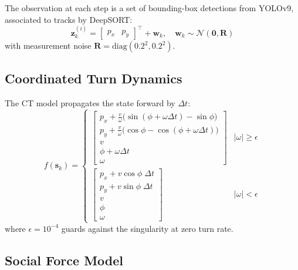 \documentclass[conference]{IEEEtran}
\begin{document}
The observation at each step is a set of bounding-box detections from YOLOv9, associated to tracks by DeepSORT:
\begin{equation}
    \mathbf{z}_k^{(i)} = \begin{bmatrix} p_x & p_y \end{bmatrix}^\top + \mathbf{w}_k, \quad \mathbf{w}_k \sim \mathcal{N}(\mathbf{0}, \mathbf{R})
\end{equation}
with measurement noise $\mathbf{R} = \mathrm{diag}(0.2^2, 0.2^2)$.

\subsection{Coordinated Turn Dynamics}

The CT model propagates the state forward by $\Delta t$:
\begin{equation}
    f(\mathbf{s}_k) = \begin{cases}
    \begin{bmatrix}
        p_x + \frac{v}{\omega}\bigl(\sin(\phi + \omega\Delta t) - \sin\phi\bigr) \\
        p_y + \frac{v}{\omega}\bigl(\cos\phi - \cos(\phi + \omega\Delta t)\bigr) \\
        v \\
        \phi + \omega\Delta t \\
        \omega
    \end{bmatrix} & |\omega| \geq \epsilon \\[12pt]
    \begin{bmatrix}
        p_x + v\cos\phi\;\Delta t \\
        p_y + v\sin\phi\;\Delta t \\
        v \\
        \phi \\
        \omega
    \end{bmatrix} & |\omega| < \epsilon
    \end{cases}
    \label{eq:ct_dynamics}
\end{equation}
where $\epsilon = 10^{-4}$ guards against the singularity at zero turn rate.

\subsection{Social Force Model}
\end{document}
